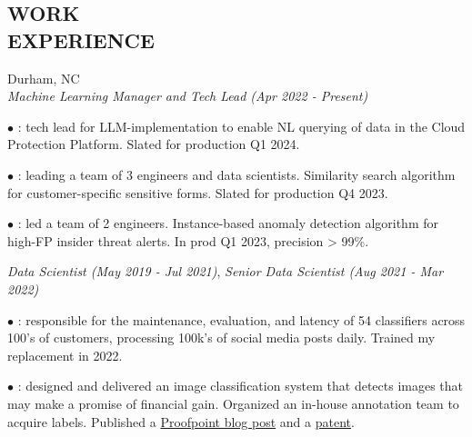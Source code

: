 \documentclass[resmargin]{resume_style_class} %
\newenvironment{outline}
  {\begin{list}{}{\setlength{\leftmargin}{30pt}\setlength\itemsep{-2pt}}}
  {\end{list}}
\begin{document}
\begin{resume}

 
\section{WORK \\ EXPERIENCE}
\begin{large}  \end{large} \hfill Durham, NC
\vspace{5pt} \\
\textit{Machine Learning Manager and Tech Lead (Apr 2022 - Present)}
\vspace{2pt}
\begin{outline}
	\item[$\bullet$\hspace{0.1cm}] : tech lead for LLM-implementation to enable NL querying of data in the Cloud Protection Platform. Slated for production Q1 2024.
	\item[$\bullet$\hspace{0.1cm}] : leading a team of 3 engineers and data scientists. Similarity search algorithm for customer-specific sensitive forms. Slated for production Q4 2023.
	\item[$\bullet$\hspace{0.1cm}] : led a team of 2 engineers. Instance-based anomaly detection algorithm for high-FP insider threat alerts. In prod Q1 2023, precision > 99\%.
\end{outline} 
\textit{Data Scientist (May 2019 - Jul 2021)}, \textit{Senior Data Scientist (Aug 2021 - Mar 2022)}
\vspace{2pt}
\begin{outline}
	\item[$\bullet$\hspace{0.1cm}]  : responsible for the maintenance, evaluation, and latency of 54 classifiers across 100's of customers, processing 100k's of social media posts daily. Trained my replacement in 2022.
	\item[$\bullet$\hspace{0.1cm}] : designed and delivered an image classification system that detects images that may make a promise of financial gain. Organized an in-house annotation team to acquire labels. Published a \href{https://www.proofpoint.com/us/blog/engineering-insights/development-of-the-promissory-images-classifier}{Proofpoint blog post} and a \href{https://image-ppubs.uspto.gov/dirsearch-public/print/downloadPdf/11526710}{patent}.

\end{outline}
\end{resume}
\end{document}
